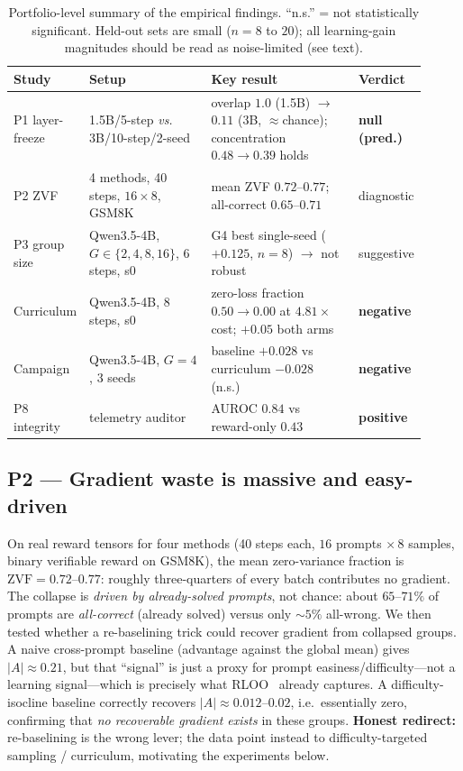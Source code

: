\documentclass[11pt,a4paper]{article}
\newcommand{\zvf}{\mathrm{ZVF}}
\begin{document}
\begin{table}[t]
\centering
\small
\begin{tabular}{@{}L{0.14\linewidth}L{0.30\linewidth}L{0.37\linewidth}L{0.10\linewidth}@{}}
\toprule
\textbf{Study} & \textbf{Setup} & \textbf{Key result} & \textbf{Verdict} \\
\midrule
P1 layer-freeze
& 1.5B/5-step \emph{vs.} 3B/10-step/2-seed
& overlap $1.0$ (1.5B) $\to$ $0.11$ (3B, ${\approx}$chance); concentration $0.48{\to}0.39$ holds
& \textbf{null (pred.)} \\
P2 ZVF
& 4 methods, 40 steps, $16\times8$, GSM8K
& mean ZVF $0.72$--$0.77$; all-correct $0.65$--$0.71$
& diagnostic \\
P3 group size
& Qwen3.5-4B, $G\in\{2,4,8,16\}$, 6 steps, s0
& G4 best single-seed ($+0.125$, $n{=}8$) $\to$ not robust
& suggestive \\
Curriculum
& Qwen3.5-4B, 8 steps, s0
& zero-loss fraction $0.50\to0.00$ at $4.81\times$ cost; $+0.05$ both arms
& \textbf{negative} \\
Campaign
& Qwen3.5-4B, $G{=}4$, 3 seeds
& baseline $+0.028$ vs curriculum $-0.028$ (n.s.)
& \textbf{negative} \\
P8 integrity
& telemetry auditor
& AUROC $0.84$ vs reward-only $0.43$
& \textbf{positive} \\
\bottomrule
\end{tabular}
\caption{Portfolio-level summary of the empirical findings. ``n.s.'' = not
statistically significant. Held-out sets are small ($n=8$ to $20$); all
learning-gain magnitudes should be read as noise-limited (see text).}
\label{tab:summary}
\end{table}

\subsection{P2 --- Gradient waste is massive and easy-driven}
On real reward tensors for four methods (40 steps each, $16$ prompts
$\times\,8$ samples, binary verifiable reward on GSM8K), the mean zero-variance
fraction is $\zvf = 0.72$--$0.77$: roughly three-quarters of every batch
contributes no gradient. The collapse is \emph{driven by already-solved prompts}, not chance: about
$65$--$71\%$ of prompts are \emph{all-correct} (already solved) versus only
${\sim}5\%$ all-wrong. We then tested whether a re-baselining trick could recover
gradient from collapsed groups. A naive cross-prompt baseline (advantage against
the global mean) gives $|A|\approx0.21$, but that ``signal'' is just a proxy for
prompt easiness/difficulty---not a learning signal---which is precisely what
RLOO~\cite{ahmadian2024rloo} already captures. A difficulty-isocline baseline
correctly recovers $|A|\approx0.012$--$0.02$, i.e.\ essentially zero, confirming
that \emph{no recoverable gradient exists} in these groups. \textbf{Honest
redirect:} re-baselining is the wrong lever; the data point instead to
difficulty-targeted sampling / curriculum, motivating the experiments below.
\end{document}
